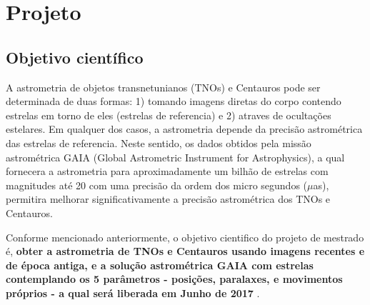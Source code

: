 \documentclass[a4paper, 11pt]{article}
\begin{document}
\renewcommand{\figurename}{\textsc{Figura}}
\renewcommand{\tablename}{\textsc{Tabela}}
\renewcommand{\refname}{Refer\^encias}




\section{Projeto}

\subsection{Objetivo científico}

A astrometria de objetos transnetunianos (TNOs) e Centauros pode ser determinada de duas formas: 1) tomando imagens diretas do corpo contendo estrelas em torno de eles (estrelas de referencia) e 2) atraves de ocultações estelares. Em qualquer dos casos, a astrometria depende da precisão astrométrica das estrelas de referencia. Neste sentido, os dados obtidos pela missão astrométrica GAIA (Global Astrometric Instrument for Astrophysics), a qual fornecera a astrometria para aproximadamente um bilhão de estrelas com magnitudes até 20 com uma precisão da ordem dos micro segundos ($\mu$as), permitira melhorar significativamente a precisão astrométrica dos TNOs e Centauros.

Conforme mencionado anteriormente, o objetivo cientifico do projeto de mestrado é, \textbf{obter a astrometria de TNOs e Centauros usando imagens recentes e de época antiga, e a solução astrométrica GAIA com estrelas contemplando os 5 parâmetros - posições, paralaxes, e movimentos próprios - a qual será liberada em Junho de 2017 }.
\end{document}

